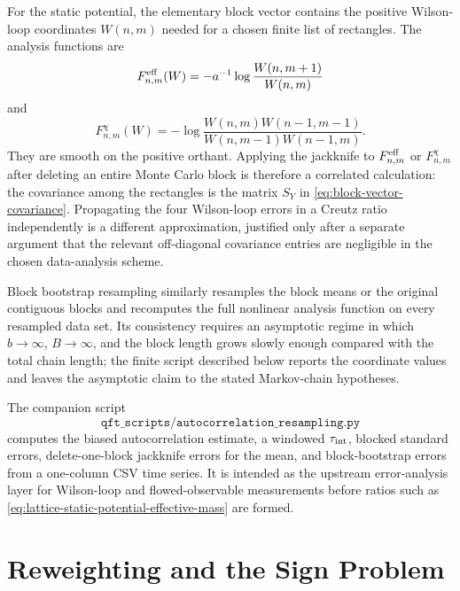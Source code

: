 For the static potential, the elementary block vector contains the positive
Wilson-loop coordinates \(W(n,m)\) needed for a chosen finite list of
rectangles.  The analysis functions are
\begin{equation}
  F^{\rm eff}_{n,m}(W)
  =
  -a^{-1}\log\frac{W(n,m+1)}{W(n,m)}
  \label{eq:effective-mass-analysis-function}
\end{equation}
and
\begin{equation}
  F^\chi_{n,m}(W)
  =
  -\log
  \frac{W(n,m)W(n-1,m-1)}
       {W(n,m-1)W(n-1,m)} .
  \label{eq:creutz-analysis-function}
\end{equation}
They are smooth on the positive orthant.  Applying the jackknife to
\(F^{\rm eff}_{n,m}\) or \(F^\chi_{n,m}\) after deleting an entire Monte Carlo
block is therefore a correlated calculation: the covariance among the
rectangles is the matrix \(S_Y\) in
\eqref{eq:block-vector-covariance}.  Propagating the four Wilson-loop errors
in a Creutz ratio independently is a different approximation, justified only
after a separate argument that the relevant off-diagonal covariance entries
are negligible in the chosen data-analysis scheme.

Block bootstrap resampling similarly resamples the block means or the original
contiguous blocks and recomputes the full nonlinear analysis function on every
resampled data set.  Its consistency requires an asymptotic regime in which
\(b\to\infty\), \(B\to\infty\), and the block length grows slowly enough
compared with the total chain length; the finite script described below
reports the coordinate values and leaves the asymptotic claim to the stated
Markov-chain hypotheses.

The companion script
\[
  \texttt{qft\_scripts/autocorrelation\_resampling.py}
\]
computes the biased autocorrelation estimate, a windowed
\(\tau_{\rm int}\), blocked standard errors, delete-one-block jackknife
errors for the mean, and block-bootstrap errors from a one-column CSV time
series.  It is intended as the upstream error-analysis layer for Wilson-loop
and flowed-observable measurements before ratios such as
\eqref{eq:lattice-static-potential-effective-mass} are formed.

\section{Reweighting and the Sign Problem}

